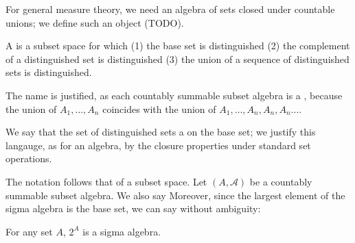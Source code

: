 
\sbasic

























\sstart
{}


For general measure theory,
we need an algebra of sets
closed under countable unions;
we define such an object (TODO).


A 
is a subset space for which
(1) the base set is distinguished
(2) the complement of a distinguished
set is distinguished
(3) the union of a sequence of distinguished sets
is distinguished.

The name is justified, as
each countably summable subset algebra is a
,
because the union of $A_1, \dots, A_n$
coincides with the union of
$A_1, \dots, A_n, A_n, A_n \dots$.

We say that the set of distinguished
sets a  on the
base set; we justify this langauge, as for
an algebra, by the closure properties
under standard set operations.


The notation follows that of a subset space.
Let $(A, \mathcal{A})$ be a countably summable
subset algebra.
We also say 
Moreover, since the largest element of the
sigma algebra is the base set, we can say without
ambiguity: 


\begin{expl}
  For any set $A$, $2^{A}$ is a sigma algebra.
\end{expl}

